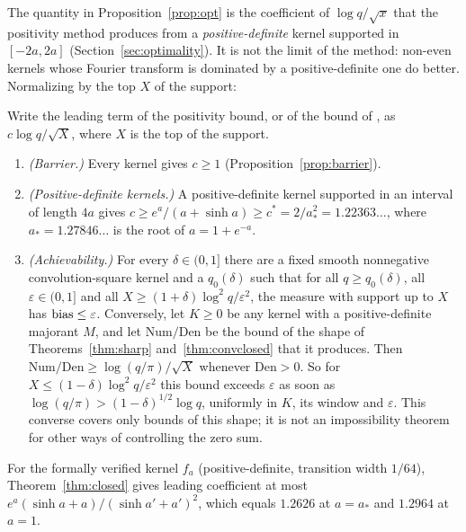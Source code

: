 The quantity in Proposition~\ref{prop:opt} is the coefficient of $\log q/\sqrt x$ that the positivity method
produces from a \emph{positive-definite} kernel supported in $[-2a,2a]$ (Section~\ref{sec:optimality}). It is not
the limit of the method: non-even kernels whose Fourier transform is dominated by a positive-definite one do better.
Normalizing by the top $X$ of the support:

\begin{corollary}[informal]\label{cor:asymp}
Write the leading term of the positivity bound, or of the bound of \cite[Lemma~6.1]{lls2015}, as $c\log q/\sqrt X$, where
$X$ is the top of the support.
\begin{enumerate}
\item \emph{(Barrier.)} Every kernel gives $c\ge1$ (Proposition~\ref{prop:barrier}).
\item \emph{(Positive-definite kernels.)} A positive-definite kernel supported in an interval of length $4a$ gives
  $c\ge e^a/(a+\sinh a)\ge c^*=2/a_*^2=1.22363\ldots$, where $a_*=1.27846\ldots$ is the root of $a=1+e^{-a}$.
\item \emph{(Achievability.)} For every $\delta\in(0,1]$ there are a fixed smooth nonnegative convolution-square kernel and a
  $q_0(\delta)$ such that for all $q\ge q_0(\delta)$, all $\varepsilon\in(0,1]$ and all $X\ge(1+\delta)\log^2q/\varepsilon^2$, the
  measure with support up to $X$ has $\operatorname{bias}\le\varepsilon$. Conversely, let $K\ge0$ be any kernel with a positive-definite majorant $M$, and
  let $\mathrm{Num}/\mathrm{Den}$ be the bound of the shape of Theorems~\ref{thm:sharp} and~\ref{thm:convclosed} that it produces. Then
  $\mathrm{Num}/\mathrm{Den}\ge\log(q/\pi)/\sqrt X$ whenever $\mathrm{Den}>0$. So for $X\le(1-\delta)\log^2q/\varepsilon^2$ this bound exceeds
  $\varepsilon$ as soon as $\log(q/\pi)>(1-\delta)^{1/2}\log q$, uniformly in $K$, its window and $\varepsilon$. This converse covers only
  bounds of this shape; it is not an impossibility theorem for other ways of controlling the zero sum.
\end{enumerate}
For the formally verified kernel $f_a$ (positive-definite, transition width $1/64$), Theorem~\ref{thm:closed} gives leading
coefficient at most $e^a(\sinh a+a)/(\sinh a'+a')^2$, which equals $1.2626$ at $a=a_*$ and $1.2964$ at $a=1$.
\end{corollary}

